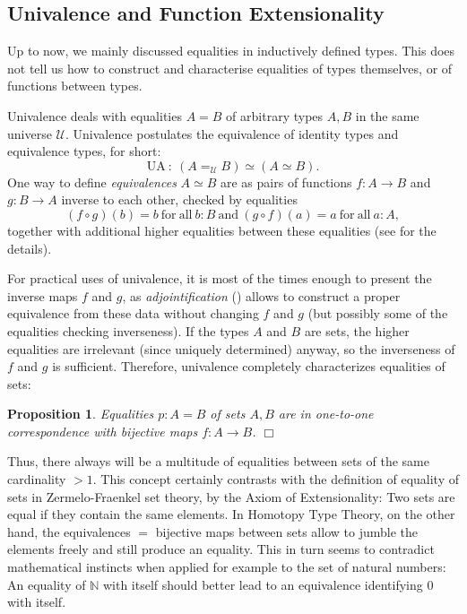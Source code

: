 \documentclass{amsart}
\theoremstyle{plain}
\numberwithin{equation}{section} %
\numberwithin{figure}{section} %
\theoremstyle{plain}
\theoremstyle{plain}
\theoremstyle{plain}
\theoremstyle{plain}
\theoremstyle{plain}
\newtheorem{prop}[thm]{Proposition} %
\theoremstyle{plain}
\theoremstyle{remark}
\theoremstyle{remark}
\theoremstyle{remark}
\begin{document}


\subsection{Univalence and Function Extensionality} \label{univ-ssec}

Up to now, we mainly discussed equalities in inductively defined types. This does not tell us how to construct and characterise equalities of types themselves, or of functions between types.

Univalence deals with equalities $A = B$ of arbitrary types $A, B$ in the same universe $\mathcal{U}$. Univalence postulates the equivalence of identity types and equivalence types, for short:
\[ \mathrm{UA}\ : \ (A =_\mathcal{U} B) \simeq (A \simeq B). \]
One way to define \textit{equivalences} $A \simeq B$ are as pairs of functions $f : A \rightarrow B$ and $g : B \rightarrow A$ inverse to each other, checked by equalities
\[ (f \circ g)(b) = b\ \mathrm{for\ all\ } b : B\ \mathrm{and\ } (g \circ f)(a) = a\ \mathrm{for\ all\ } a : A, \]
together with additional higher equalities between these equalities (see \cite[Def.4.2.1]{HoTTBook} for the details). 

For practical uses of univalence, it is most of the times enough to present the inverse maps $f$ and $g$, as \textit{adjointification} (\cite[Thm.4.2.3]{HoTTBook}) allows to construct a proper equivalence from these data without changing $f$ and $g$ (but possibly some of the equalities checking inverseness). If the types $A$ and $B$ are sets, the higher equalities are irrelevant (since uniquely determined) anyway, so the inverseness of $f$ and $g$ is sufficient. Therefore, univalence completely characterizes equalities of sets:
\begin{prop}   %
Equalities $p : A = B$ of sets $A, B$ are in one-to-one correspondence with bijective maps $f : A \rightarrow B$. \hfill $\Box$
\end{prop}
Thus, there always will be a multitude of equalities between sets of the same cardinality $> 1$. This concept certainly contrasts with the definition of equality of sets in Zermelo-Fraenkel set theory, by the Axiom of Extensionality: Two sets are equal if they contain the same elements. In Homotopy Type Theory, on the other hand, the equivalences $=$ bijective maps between sets allow to jumble the elements freely and still produce an equality. This in turn seems to contradict mathematical instincts when applied for example to the set of natural numbers: An equality of $\mathbb{N}$ with itself should better lead to an equivalence identifying $0$ with itself. 
\end{document}
